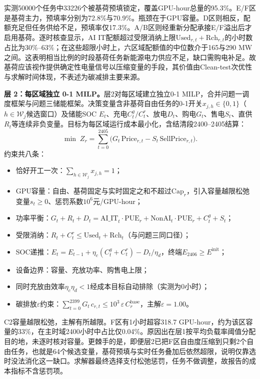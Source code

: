 实测50000个任务中33226个被基荷预填锁定，覆盖GPU-hour总量的95.3\%。E/F区是基荷主力，预填率分别为72.8\%与70.9\%。瓶颈在于GPU容量。D区则相反，配额充足但任务供给不足，预填率仅17.3\%。A/B区则经重新分配承接E/F溢出后才启用基荷。逐时核查显示，AI IT配额超过受限消纳上限$\text{Used}_{r,t}+\text{Rch}_{r,t}$的小时数占比为30\%--63\%；在这些超限小时上，六区域配额值的中位数介于165与290 MW之间。这表明相当比例的时段基荷任务新能源电力供应不足，缺口需购电补足。故基荷应该视作提供确定性电量信号以压缩变量的手段，其价值由Clean-test次优性与求解时间体现，不表述为碳减排主要来源。

\medskip\noindent\textbf{层 2：每区域独立 0-1 MILP。}层2对每区域建立独立0-1 MILP，合并问题一调度框架与问题三储能框架。决策变量含非基荷自由任务的0-1开关$x_{j,h}\in\{0,1\}$（$h\in\mathcal{W}_j$候选窗口）及储能SOC $E_t$、充电$C^g_t/C^r_t$、放电$D_t$、购电$G_t$、售电$S_t$、直供$R_t$等连续非负变量。目标为每区域运行成本最小化，含结清段2400--2405结算：
\begin{equation}
  \min\; Z_r = \sum_{t=0}^{2405}\!\big(G_t\,\text{Price}_{r,t} - S_t\,\text{SellPrice}_{r,t}\big).
\end{equation}
约束共八条：
\begin{itemize}
\item[(C1)] 恰好开工一次：$\sum_{h\in\mathcal{W}_j}x_{j,h}=1$；
\item[(C2)] GPU容量：自由、基荷固定与实时固定之和不超过$\text{Cap}_r$，引入容量越限松弛变量$s_t\ge0$、惩罚系数$10^6$元/GPU-hour；
\item[(C3)] 功率平衡：$G_t+R_t+D_t=\text{AI\_IT}_t\cdot\text{PUE}_r+\text{NonAI}_t\cdot\text{PUE}_r+C^g_t+S_t$；
\item[(C4)] 受限消纳：$R_t+C^r_t\le\text{Used}_t+\text{Rch}_t$（与问题三同口径）；
\item[(C5)] SOC递推：$E_t=E_{t-1}+\eta_c(C^g_t+C^r_t)-D_t/\eta_d$，终端$E_{2406}\ge E^{\text{init}}$；
\item[(C6)] 设备边界：容量、充放功率、购售电上限；
\item[(C7)] 同时充放由效率$\eta_c\eta_d<1$经成本目标自动排除（实测为0小时）；
\item[(C8)] 碳排放$\varepsilon$约束：$\sum_{t=0}^{2399}G_t\,c_{r,t}\le10^3\,\varepsilon\,C^{\text{base}}_r$，主解$\varepsilon=1.00$。
\end{itemize}

C2容量越限松弛，主解有所越限。F区有1小时超容318.7 GPU-hour，约为该区容量的33\%，在主时域2400小时中占比仅0.04\%。原因出在层1按平均负载率阈值分配目的地，未逐时核对容量。更棘手的是，即便层2已把F区自由度压缩到只剩2个自由任务，也就是64个候选变量，基荷预填与实时任务叠加后依然超限，说明仅靠选时没法消化这一缺口。求解器最终选择支付松弛惩罚，任务不做调整，故报告的成本指标不含惩罚项。

